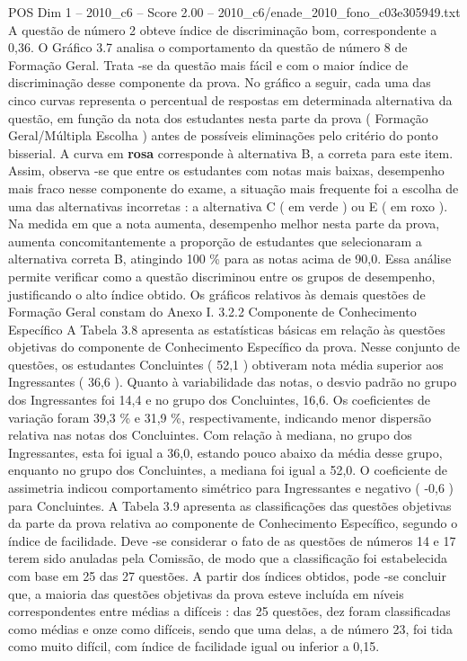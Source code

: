\begin{textsample}{POS Dim 1 – 2010\_c6 – Score 2.00 – 2010\_c6/enade\_2010\_fono\_c03e305949.txt}
A questão de número 2 obteve índice de discriminação bom, correspondente a 0,36.
O Gráfico 3.7 analisa o comportamento da questão de número 8 de Formação Geral.
Trata -se da questão mais fácil e com o maior índice de discriminação desse componente da prova.
No gráfico a seguir, cada uma das cinco curvas representa o percentual de respostas em determinada alternativa da questão, em função da nota dos estudantes nesta parte da prova ( Formação Geral/Múltipla Escolha ) antes de possíveis eliminações pelo critério do ponto bisserial.
A curva em \textbf{rosa} corresponde à alternativa B, a correta para este item.
Assim, observa -se que entre os estudantes com notas mais baixas, desempenho mais fraco nesse componente do exame, a situação mais frequente foi a escolha de uma das alternativas incorretas : a alternativa C ( em verde ) ou E ( em roxo ).
Na medida em que a nota aumenta, desempenho melhor nesta parte da prova, aumenta concomitantemente a proporção de estudantes que selecionaram a alternativa correta B, atingindo 100 \% para as notas acima de 90,0.
Essa análise permite verificar como a questão discriminou entre os grupos de desempenho, justificando o alto índice obtido.
Os gráficos relativos às demais questões de Formação Geral constam do Anexo I. 3.2.2 Componente de Conhecimento Específico A Tabela 3.8 apresenta as estatísticas básicas em relação às questões objetivas do componente de Conhecimento Específico da prova.
Nesse conjunto de questões, os estudantes Concluintes ( 52,1 ) obtiveram nota média superior aos Ingressantes ( 36,6 ).
Quanto à variabilidade das notas, o desvio padrão no grupo dos Ingressantes foi 14,4 e no grupo dos Concluintes, 16,6.
Os coeficientes de variação foram 39,3 \% e 31,9 \%, respectivamente, indicando menor dispersão relativa nas notas dos Concluintes.
Com relação à mediana, no grupo dos Ingressantes, esta foi igual a 36,0, estando pouco abaixo da média desse grupo, enquanto no grupo dos Concluintes, a mediana foi igual a 52,0.
O coeficiente de assimetria indicou comportamento simétrico para Ingressantes e negativo ( -0,6 ) para Concluintes.
A Tabela 3.9 apresenta as classificações das questões objetivas da parte da prova relativa ao componente de Conhecimento Específico, segundo o índice de facilidade.
Deve -se considerar o fato de as questões de números 14 e 17 terem sido anuladas pela Comissão, de modo que a classificação foi estabelecida com base em 25 das 27 questões.
A partir dos índices obtidos, pode -se concluir que, a maioria das questões objetivas da prova esteve incluída em níveis correspondentes entre médias a difíceis : das 25 questões, dez foram classificadas como médias e onze como difíceis, sendo que uma delas, a de número 23, foi tida como muito difícil, com índice de facilidade igual ou inferior a 0,15.

\end{textsample}

